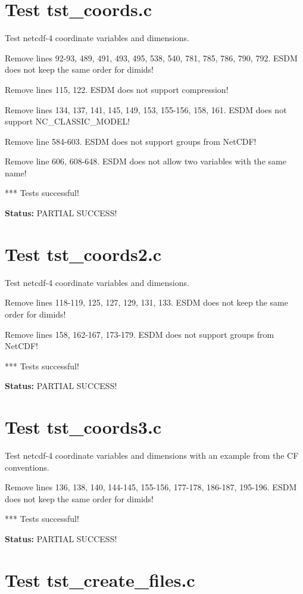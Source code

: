 \section{Test tst\_coords.c}

Test netcdf-4 coordinate variables and dimensions.

Remove lines 92-93, 489, 491, 493, 495, 538, 540, 781, 785, 786, 790, 792. ESDM does not keep the same order for dimids!

Remove lines 115, 122. ESDM does not support compression!

Remove lines 134, 137, 141, 145, 149, 153, 155-156, 158, 161. ESDM does not support NC\_CLASSIC\_MODEL!

Remove line 584-603. ESDM does not support groups from NetCDF!

Remove line 606, 608-648. ESDM does not allow two variables with the same name!

*** Tests successful!

{\bf \large Status: } PARTIAL SUCCESS!

\section{Test tst\_coords2.c}

Test netcdf-4 coordinate variables and dimensions.

Remove lines 118-119, 125, 127, 129, 131, 133. ESDM does not keep the same order for dimids!

Remove lines 158, 162-167, 173-179. ESDM does not support groups from NetCDF!

*** Tests successful!

{\bf \large Status: } PARTIAL SUCCESS!

\section{Test tst\_coords3.c}

Test netcdf-4 coordinate variables and dimensions with an example from the CF conventions.

Remove lines 136, 138, 140, 144-145, 155-156, 177-178, 186-187, 195-196. ESDM does not keep the same order for dimids!

*** Tests successful!

{\bf \large Status: } PARTIAL SUCCESS!

\section{Test tst\_create\_files.c}

